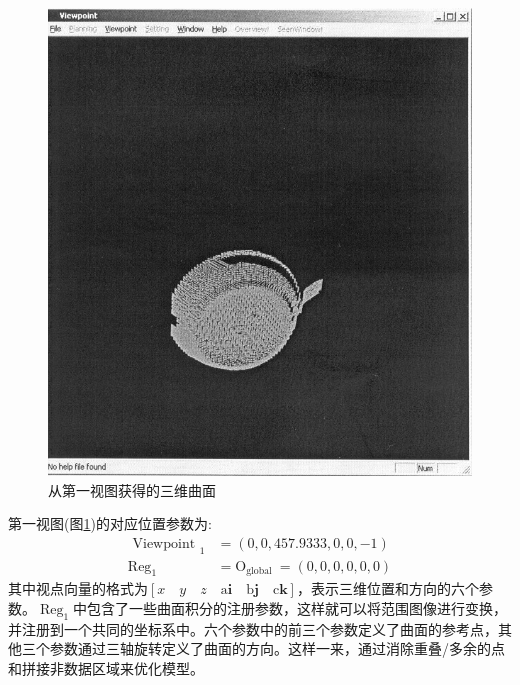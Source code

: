 \documentclass[AutoFakeBold,zihao=-4]{ctexart}
\begin{document}
	\begin{figure}[h]
		\centering
		\includegraphics[scale=0.4]{PIC7}
		\caption{从第一视图获得的三维曲面}
		\label{fig-first-view}
	\end{figure}
	第一视图(图\ref{fig-first-view})的对应位置参数为:
	\begin{equation*}
		\begin{aligned}
			\text { Viewpoint }_{1} &=(0,0,457.9333,0,0,-1) \\
			\operatorname{Reg}_{1} &=\mathrm{O}_{\text {global }}=(0,0,0,0,0,0)
		\end{aligned}
	\end{equation*}
	其中视点向量的格式为$ [x \quad y \quad z \quad \mathrm{a} \boldsymbol{i} \quad \mathrm{b} \boldsymbol{j} \quad \mathrm{c} \boldsymbol{k}] $，表示三维位置和方向的六个参数。$ \operatorname{Reg}_{1} $中包含了一些曲面积分的注册参数，这样就可以将范围图像进行变换，并注册到一个共同的坐标系中。六个参数中的前三个参数定义了曲面的参考点，其他三个参数通过三轴旋转定义了曲面的方向。这样一来，通过消除重叠/多余的点和拼接非数据区域来优化模型。
	
\end{document}
